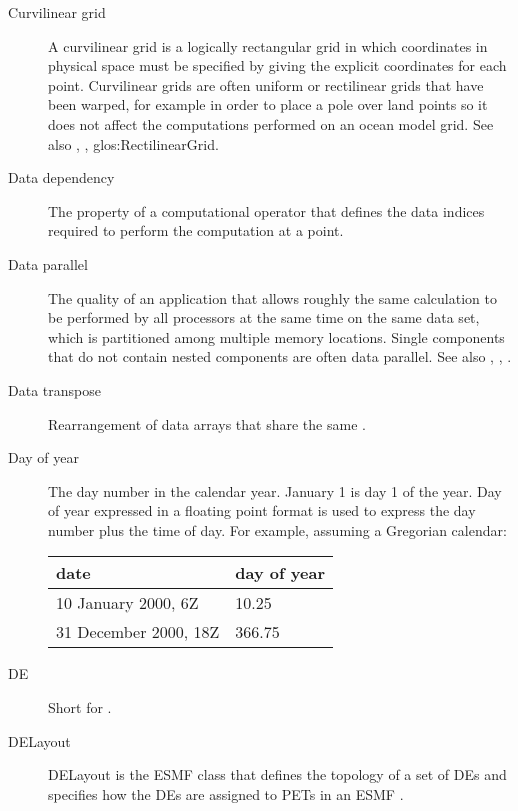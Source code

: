 \begin{description}
\label{glos:CurvilinearGrid}
\item[Curvilinear grid]
  A curvilinear grid is a logically rectangular grid in which 
  coordinates in physical space must be specified by giving 
  the explicit coordinates for each point.  Curvilinear
  grids are often uniform or rectilinear grids that have been 
  warped, for example in order to place a pole over land points
  so it does not affect the computations performed on an
  ocean model grid.  See also 
  ,
  , 
  {glos:RectilinearGrid}.  
  
\label{glos:DataDep}
\item[Data dependency] The property of a computational
  operator that defines the data indices required to perform
  the computation at a point.  

\label{glos:DataParallel}
\item[Data parallel] The quality of an application that allows roughly 
  the same calculation to be performed by all processors at the same 
  time on the same data set, which is partitioned among multiple memory 
  locations.  Single components that do not contain nested components
  are often data parallel.  See also 
  , , 
  .   

\label{glos:DataTranspose}
\item[Data transpose] Rearrangement of data arrays that share the 
  same .  

\label{glos:DayOfYear}
\item[Day of year] The day number in the calendar year. 
  January 1 is day 1 of the year. Day of year expressed in a floating point 
  format is used to express the day number plus the time of day. 
  For example, assuming a Gregorian calendar:

\begin{tabular}{ll}
  {\bf date}              & {\bf day of year} \\
  \hline 
  10 January 2000, 6Z     & 10.25 \\
  31 December 2000, 18Z   & 366.75 
\end{tabular}

\label{glos:DE}
\item[DE] 
  Short for .

\label{glos:DELayout}
\item[DELayout] DELayout is the ESMF class that
  defines the topology of a set of DEs and specifies 
  how the DEs are assigned to PETs in an ESMF  
  . 


\end{description}

